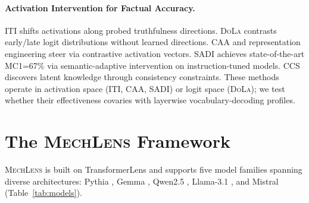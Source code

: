 \documentclass[11pt]{article}
\newcommand{\mechlens}{\textsc{MechLens}}
\newcommand{\iti}{\textsc{ITI}}
\newcommand{\dola}{\textsc{DoLa}}
\newcommand{\caa}{\textsc{CAA}}
\begin{document}
\paragraph{Activation Intervention for Factual Accuracy.}
\iti{} \citep{li2023inference} shifts activations along probed truthfulness directions. \dola{} \citep{chuang2024dola} contrasts early/late logit distributions without learned directions. \caa{} \citep{turner2023activation} and representation engineering \citep{zou2023representation} steer via contrastive activation vectors. SADI \citep{zhang2025sadi} achieves state-of-the-art MC1=67\% via semantic-adaptive intervention on instruction-tuned models. CCS \citep{burns2022discovering} discovers latent knowledge through consistency constraints. These methods operate in activation space (\iti{}, \caa{}, SADI) or logit space (\dola{}); we test whether their effectiveness covaries with layerwise vocabulary-decoding profiles.

\section{The \mechlens{} Framework}
\label{sec:framework}

\mechlens{} is built on TransformerLens \citep{nanda2022transformerlens} and supports five model families spanning diverse architectures: Pythia \citep{biderman2023pythia}, Gemma \citep{gemma2024}, Qwen2.5 \citep{qwen2024qwen25}, Llama-3.1 \citep{dubey2024llama3}, and Mistral \citep{jiang2023mistral} (Table~\ref{tab:models}).

\begin{table}[t]
\centering
\small
{}
\caption{Supported model architectures. Qwen2.5-14B enables cross-scale validation (\S\ref{sec:scale}).}
\label{tab:models}
\end{table}
\end{document}
